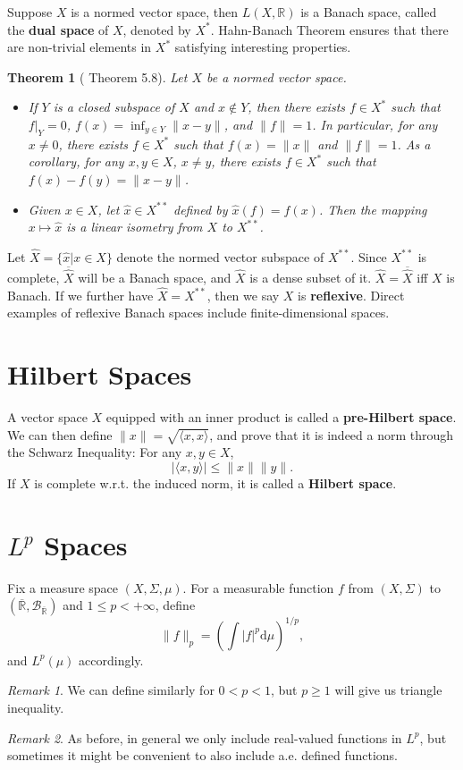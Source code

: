 \documentclass[openany]{book}
\newtheorem{theorem}{Theorem}[chapter]
\theoremstyle{definition}
\theoremstyle{remark}
\newtheorem*{remark}{Remark}
\begin{document}
Suppose $X$ is a normed vector space, then $L(X,\mathbb{R})$ is a Banach space, called the \textbf{dual space} of $X$, denoted by $X^*$. Hahn-Banach Theorem ensures that there are non-trivial elements in $X^*$ satisfying interesting properties.
\begin{theorem}[\cite{F13} Theorem 5.8]
    Let $X$ be a normed vector space.
    \begin{itemize}
        \item If $Y$ is a closed subspace of $X$ and $x\not\in Y$, then there exists $f\in X^*$ such that $f|_Y=0$, $f(x)=\inf_{y\in Y}\|x-y\|$, and $\|f\|=1$. In particular, for any $x\ne0$, there exists $f\in X^*$ such that $f(x)=\|x\|$ and $\|f\|=1$. As a corollary, for any $x,y\in X$, $x\ne y$, there exists $f\in X^*$ such that $f(x)-f(y)=\|x-y\|$.

        \item Given $x\in X$, let $\hat{x}\in X^{**}$ defined by $\hat{x}(f)=f(x)$. Then the mapping $x\mapsto\hat{x}$ is a linear isometry from $X$ to $X^{**}$.
    \end{itemize}
\end{theorem}
Let $\widehat{X}=\{\hat{x}|x\in X\}$ denote the normed vector subspace of $X^{**}$. Since $X^{**}$ is complete, $\overline{\widehat{X}}$ will be a Banach space, and $\widehat{X}$ is a dense subset of it. $\widehat{X}=\overline{\widehat{X}}$ iff $X$ is Banach. If we further have $\widehat{X}=X^{**}$, then we say $X$ is \textbf{reflexive}. Direct examples of reflexive Banach spaces include finite-dimensional spaces.

\section{Hilbert Spaces}
A vector space $X$ equipped with an inner product is called a \textbf{pre-Hilbert space}. We can then define $\|x\|=\sqrt{\langle x,x\rangle}$, and prove that it is indeed a norm through the Schwarz Inequality: For any $x,y\in X$,
\begin{equation*}
    \left|\langle x,y\rangle\right|\le\|x\|\|y\|.
\end{equation*}
If $X$ is complete w.r.t. the induced norm, it is called a \textbf{Hilbert space}.

\section{$L^p$ Spaces}
Fix a measure space $(X,\Sigma,\mu)$. For a measurable function $f$ from $(X,\Sigma)$ to $(\overline{\mathbb{R}},\mathcal{B}_{\overline{\mathbb{R}}})$ and $1\le p<+\infty$, define
\begin{equation*}
    \|f\|_p=\left(\int|f|^p \mathrm{d}\mu\right)^{1/p},
\end{equation*}
and $L^p(\mu)$ accordingly.
\begin{remark}
    We can define similarly for $0<p<1$, but $p\ge1$ will give us triangle inequality.
\end{remark}
\begin{remark}
    As before, in general we only include real-valued functions in $L^p$, but sometimes it might be convenient to also include a.e. defined functions.
\end{remark}
\end{document}
